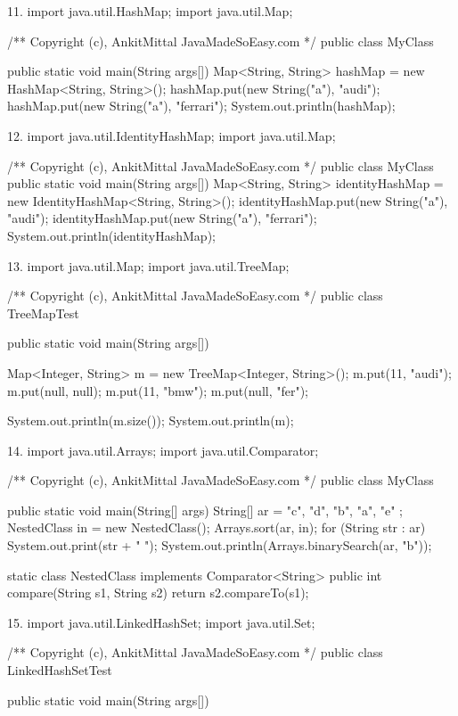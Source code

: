 {11.
import java.util.HashMap;
import java.util.Map;
 
/** Copyright (c), AnkitMittal JavaMadeSoEasy.com */
public class MyClass {
    public static void main(String args[]) {
           Map<String, String> hashMap = new HashMap<String, String>();
           hashMap.put(new String("a"), "audi");
           hashMap.put(new String("a"), "ferrari");
           System.out.println(hashMap);
    }
 
}


12.
import java.util.IdentityHashMap;
import java.util.Map;
 
/** Copyright (c), AnkitMittal JavaMadeSoEasy.com */
public class MyClass {
    public static void main(String args[]) {
           Map<String, String> identityHashMap = new IdentityHashMap<String, String>();
           identityHashMap.put(new String("a"), "audi");
           identityHashMap.put(new String("a"), "ferrari");
           System.out.println(identityHashMap);
    }
}


13.
import java.util.Map;
import java.util.TreeMap;
 
/** Copyright (c), AnkitMittal JavaMadeSoEasy.com */
public class TreeMapTest {
    public static void main(String args[]) {
 
           Map<Integer, String> m = new TreeMap<Integer, String>();
           m.put(11, "audi");
           m.put(null, null);
           m.put(11, "bmw");
           m.put(null, "fer");
 
           System.out.println(m.size());
           System.out.println(m);
    }
 
}


14.
import java.util.Arrays;
import java.util.Comparator;
 
/** Copyright (c), AnkitMittal JavaMadeSoEasy.com */
public class MyClass {
    public static void main(String[] args) {
           String[] ar = { "c", "d", "b", "a", "e" };
           NestedClass in = new NestedClass();
           Arrays.sort(ar, in);
           for (String str : ar)
                  System.out.print(str + " ");
           System.out.println(Arrays.binarySearch(ar, "b"));
    }
 
    static class NestedClass implements Comparator<String> {
           public int compare(String s1, String s2) {
                  return s2.compareTo(s1);
           }
    }
}


15.
import java.util.LinkedHashSet;
import java.util.Set;
 
/** Copyright (c), AnkitMittal JavaMadeSoEasy.com */
public class LinkedHashSetTest {
    public static void main(String args[]) {
 
}}}
